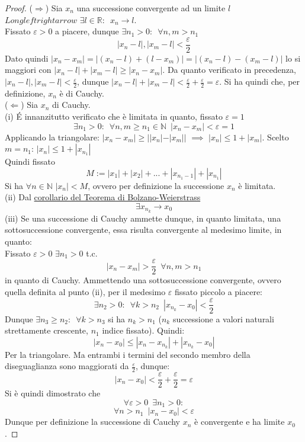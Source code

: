 \documentclass[10pt]{article}
\theoremstyle{plain}
\begin{document}
\begin{proof}
($\Rightarrow$) Sia $x_n$ una successione convergente ad un limite $l$ $Longleftrightarrow$ $\exists l \in \mathbb{R} : \enspace x_n \rightarrow l$. \\Fissato $\varepsilon > 0$ a piacere, dunque $\exists n_1 > 0 : \enspace \forall n,m > n_1$
\[|x_n - l|, |x_m - l| < \frac{\varepsilon}{2}\]
Dato quindi $|x_n - x_m| = |(x_n - l) + (l - x_m)| = |(x_n - l) - (x_m -l)|$ lo si maggiori con $|x_n - l| + |x_m - l| \geq |x_n - x_m|$. Da quanto verificato in precedenza, $|x_n - l|, |x_m - l| < \frac{\varepsilon}{2}$, dunque $|x_n - l| + |x_m - l| < \frac{\varepsilon}{2} + \frac{\varepsilon}{2} = \varepsilon$. Si ha quindi che, per definizione, $x_n$ è di Cauchy.
\\($\Leftarrow$) Sia $x_n$ di Cauchy.\\
(i) \'E innanzitutto verificato che è limitata in quanto, fissato $\varepsilon = 1$
\[\exists n_1 > 0 : \enspace \forall n,m \geq n_1 \in \mathbb{N} \enspace |x_n - x_m| < \varepsilon = 1 \]
Applicando la triangolare: $|x_n - x_m| \geq ||x_n| - |x_m||$ $\implies$ $|x_n| \leq 1 + |x_m|$. Scelto $m = n_1$: $|x_n| \leq 1 + |x_{n_1}|$\\
Quindi fissato 
\[M := |x_1| + |x_2| + ... + |x_{n_1 - 1}| + |x_{n_1}|\]
Si ha $\forall n \in \mathbb{N}$ $|x_n| < M$, ovvero per definizione la successione $x_n$ è limitata.\\
(ii) Dal \hyperlink{corollaier}{corollario del Teorema di Bolzano-Weierstrass} \[\exists x_{n_k} \longrightarrow x_0\]
(iii) Se una successione di Cauchy ammette dunque, in quanto limitata, una sottosuccessione convergente, essa risulta convergente al medesimo limite, in quanto:\\
Fissato $\varepsilon > 0$ $\exists n_1 > 0$ t.c.
\[|x_n - x_m| > \frac{\varepsilon}{2} \enspace \forall n, m > n_1\]
in quanto di Cauchy. Ammettendo una sottosuccessione convergente, ovvero quella definita al punto (ii), per il medesimo $\varepsilon$ fissato piccolo a piacere:
\[\exists n_2 > 0 : \enspace \forall k > n_2 \enspace |x_{n_k} - x_0| < \frac{\varepsilon}{2}\]
Dunque $\exists n_3 \geq n_2 : \enspace \forall k > n_3$ si ha $n_k > n_1$ ($n_k$ successione a valori naturali strettamente crescente, $n_1$ indice fissato). Quindi:
\[|x_n - x_0| \leq |x_n - x_{n_k}| + |x_{n_k} - x_0|\]
Per la triangolare. Ma entrambi i termini del secondo membro della diseguaglianza sono maggiorati da $\frac{\varepsilon}{2}$, dunque:
\[|x_n - x_0| < \frac{\varepsilon}{2} + \frac{\varepsilon}{2} = \varepsilon\]
Si è quindi dimostrato che 
\[\forall \varepsilon > 0 \enspace \exists n_1 > 0 :\]
\[\forall n > n_1 \enspace |x_n - x_0| < \varepsilon\]
Dunque per definizione la successione di Cauchy $x_n$ è convergente e ha limite $x_0$.
\end{proof}
\end{document}
